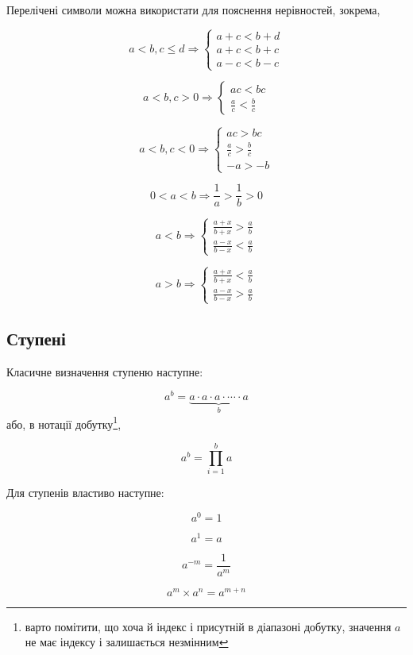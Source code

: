 \documentclass[
  11pt,
]{book}
\begin{document}
Перелічені символи можна використати для пояснення нерівностей, зокрема,

\[a < b, c \leq d \Rightarrow \begin{cases}
a + c < b + d\\
a + c < b + c\\
a - c < b - c
\end{cases}\]

\[a < b, c > 0 \Rightarrow \begin{cases}
ac < bc\\
\frac{a}{c} < \frac{b}{c}
\end{cases}\]

\[a < b, c < 0 \Rightarrow \begin{cases}
ac > bc\\
\frac{a}{c} > \frac{b}{c}\\
-a > -b
\end{cases}\]

\[0 < a < b\Rightarrow \frac{1}{a} > \frac{1}{b} > 0\]

\[a < b\Rightarrow \begin{cases}
\frac{a+x}{b+x} > \frac{a}{b} \\
\frac{a-x}{b-x} < \frac{a}{b}
\end{cases}\]

\[a > b\Rightarrow \begin{cases}
\frac{a+x}{b+x} < \frac{a}{b} \\
\frac{a-x}{b-x} > \frac{a}{b}
\end{cases}\]

\subsection{Ступені}\label{ux441ux442ux443ux43fux435ux43dux456}

Класичне визначення ступеню наступне:

\[a^b = \underbrace{a \cdot a \cdot a \cdot \cdots \cdot a}_b\]
або, в нотації добутку\footnote{варто помітити, що хоча й індекс \(і\) присутній в діапазоні добутку, значення \(a\) не має індексу і залишається незмінним},

\[a^b = \prod\limits_{i=1}^b a\]

Для ступенів властиво наступне:

\[a^0 = 1\]

\[a^1 = a\]

\[a^{-m} = \frac{1}{a^m}\]

\[a^m \times a^n = a^{m+n}\]
\end{document}
